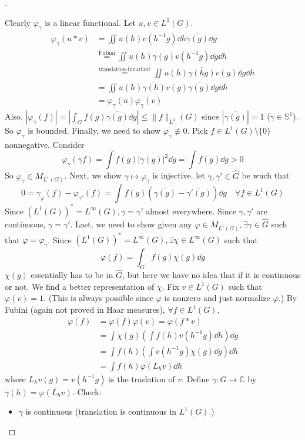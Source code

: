 \documentclass{article}
\theoremstyle{definition}
\newenvironment{proofs}[1][\proofname]{%
  \begin{proof}[#1]$ $\par\nobreak\ignorespaces
}{%
  \end{proof}
}
\newcommand{\CC}{\mathbb C}
\renewcommand{\SS}{\mathbb S}
\begin{document}
\begin{proofs}
	Clearly $\varphi_\gamma$ is a linear functional.
	Let $u, v \in L^1(G)$.
	\[
		\begin{split}
			\varphi_\gamma(u * v) &= \iint u(h) v(h^{-1} g) \dd{h} \overline{\gamma(g)} \dd{g}\\
			&\stackrel{\text{Fubini}}{=} \iint u(h) \overline{\gamma(g)} v(h^{-1} g)\dd{g} \dd{h}\\
			&\stackrel{\text{translation-invariant}}{=} \iint u(h) \overline{\gamma(hg)} v(g) \dd{g} \dd{h}\\
			&= \iint u(h) \overline{\gamma(h)} v(g) \overline{\gamma(g)} \dd{g} \dd{h}\\
			&= \varphi_\gamma(u) \varphi_\gamma(v)
		\end{split}
	\]
	Also, $|\varphi_\gamma(f)| = |\int_G f(g) \overline{\gamma(g)} \dd{g}| \leq \|f\|_{L^1}(G)$ since $|\overline{\gamma(g)}| = 1$ ($\gamma \in \SS^1$).
	So $\varphi_\gamma$ is bounded.
	Finally, we need to show $\varphi_\gamma \not\equiv 0$.
	Pick $f \in L^1(G)\setminus \{0\}$ nonnegative.
	Consider 
	\[
		\varphi_\gamma(\gamma f) = \int f(g) |\gamma(g)|^2 \dd{g} = \int f(g) \dd{g} > 0
	\]
	So $\varphi_\gamma \in M_{L^1(G)}$.
	Next, we show $\gamma \mapsto \varphi_\gamma$ is injective.
	let $\gamma, \gamma' \in \widehat{G}$ be wuch that
	\[
		0 = \gamma_\varphi(f) - \varphi_{\gamma'}(f) = \int f(g) (\overline{\gamma(g)} - \overline{\gamma'(g)}) \dd{g} \quad \forall f \in L^1(G)
	\]
	Since $(L^1(G))^* = L^\infty(G), \gamma = \gamma'$ almost everywhere.
	Since $\gamma, \gamma'$ are continuous, $\gamma = \gamma'$.
	Last, we need to show given any $\varphi \in M_{L^1(G)}, \exists \gamma \in \widehat{G}$ such that $\varphi = \varphi_\gamma$.
	Since $(L^1(G))^* = L^\infty(G), \exists \chi \in L^\infty(G)$ such that
	\[
		\varphi(f) = \int_G f(g) \chi(g) \dd{g}
	\]
	$\chi(g)$ essentially has to be in $\widehat{G}$, but here we have no idea that if it is continuous or not.
	We find a better representation of $\chi$.
	Fix $v \in L^1(G)$ such that $\varphi(v) = 1$.
	(This is always possible since $\varphi$ is nonzero and just normalize $\varphi$.)
	By Fubini (again not proved in Haar measures), $\forall f \in L^1(G)$, 
	\[
		\begin{split}
			\varphi(f) &= \varphi(f) \varphi(v) = \varphi(f * v)\\
			&= \int \chi(g) \left( \int f(h) v(h^{-1} g) \dd{h} \right) \dd{g}\\
			&= \int f(h) \left( \int v(h^{-1} g) \chi(g) \dd{g} \right) \dd{h}\\
			&= \int f(h) \varphi(L_h v) \dd{h}
		\end{split}
	\]
	where $L_h v(g) = v(h^{-1} g)$ is the traslation of $v$.
	Define $\gamma: G \to \CC$ by $\gamma(h) = \overline{\varphi(L_h v)}$.
	Check:
	\begin{itemize}
		\item $\gamma$ is continuous (translation is continuous in $L^1(G)$.)


\end{itemize}
\end{proofs}
\end{document}
